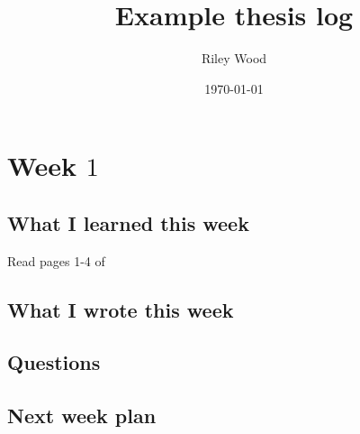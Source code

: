 \documentclass{amsart}
\title{Example thesis log}
\author{Riley Wood}
\date{\today}
\begin{document}
\maketitle

\section{Week $1$}

\subsection{What I learned this week}
Read pages 1-4 of %

\subsection{What I wrote this week}

\subsection{Questions}

\subsection{Next week plan}

%
%
\end{document}
